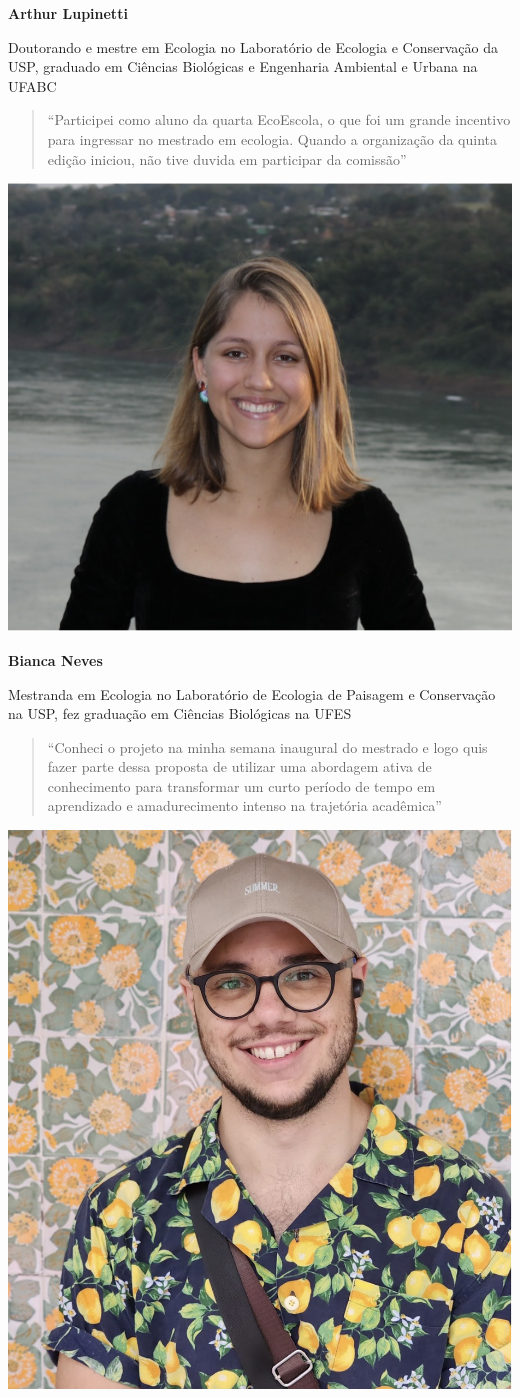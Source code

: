\documentclass[
]{book}
\begin{document}
\textbf{Arthur Lupinetti}

Doutorando e mestre em Ecologia no Laboratório de Ecologia e Conservação da USP, graduado em Ciências Biológicas e Engenharia Ambiental e Urbana na UFABC

\begin{quote}
``Participei como aluno da quarta EcoEscola, o que foi um grande incentivo para ingressar no mestrado em ecologia. Quando a organização da quinta edição iniciou, não tive duvida em participar da comissão''
\end{quote}

\begin{center}\includegraphics[width=0.5\linewidth]{figs/bianca_picture} \end{center}

\textbf{Bianca Neves}

Mestranda em Ecologia no Laboratório de Ecologia de Paisagem e Conservação na USP, fez graduação em Ciências Biológicas na UFES

\begin{quote}
``Conheci o projeto na minha semana inaugural do mestrado e logo quis fazer parte dessa proposta de utilizar uma abordagem ativa de conhecimento para transformar um curto período de tempo em aprendizado e amadurecimento intenso na trajetória acadêmica''
\end{quote}

\begin{center}\includegraphics[width=0.5\linewidth]{figs/doug_picture} \end{center}
\end{document}
